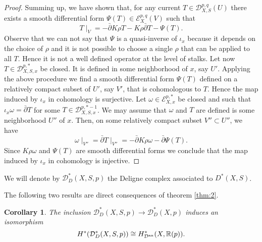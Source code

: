 \documentclass[10pt,twoside]{article}
\numberwithin{equation}{section}
\theoremstyle{plain}
\newtheorem{corollary}[equation]{Corollary}
\theoremstyle{definition}
\newcommand{\an}{\text{{\rm an}}}
\begin{document}
\begin{proof}
  Summing up, we have shown that, for any current $T\in
  \mathscr{D}^{p,q}_{X,S}(U)$ there exists a smooth differential form
  $\Psi (T)\in \mathscr{E}^{p,q}_{X}(V)$ such that
  \begin{displaymath}
    T\mid _{V}=-\bar \partial K\rho T -K\rho \bar \partial T -\Psi (T).
  \end{displaymath}
  Observe that we can not say that $\Psi $ is a quasi-inverse of
  $\iota _{x}$ because it depends on the choice of $\rho $ and it is
  not possible to choose a single $\rho $ that can be applied to all
  $T$. Hence it 
  is not a well defined operator at the level of stalks. 
  Let now $T\in \mathscr{D}^{p,*}_{X,S,x}$ be closed. It is defined in
  some neighborhood of $x$, say $U'$. Applying the above procedure we
  find a smooth differential form $\Psi (T)$ defined on a relatively
  compact subset of $U'$, say $V'$, that is cohomologous to $T$. Hence
  the map induced by $\iota _{x}$ in cohomology is surjective. Let
  $\omega \in \mathscr{E}^{p,*}_{X,x}$ be closed and such that $\iota
  _{x}\omega =\bar \partial T$ for some $T\in
  \mathscr{D}^{p,*-1}_{X,S,x}$. We may assume that $\omega $ and $T$
  are defined is some neighborhood $U''$ of $x$. Then, on some
  relatively compact subset $V''\subset U''$, we have
  \begin{displaymath}
    \omega \mid _{V''} = \bar \partial T\mid _{V''}=-\bar \partial K\rho \omega
    - \bar \partial \Psi (T).
  \end{displaymath}
  Since $K\rho \omega$ and $\Psi (T)$ are smooth differential forms we
  conclude that the map induced by $\iota_{x}$ in cohomology is injective.
\end{proof}

We will denote by  
$\mathcal{D}^{\ast}_{D}(X,S,p)$ the Deligne complex associated to
$D^{\ast}(X,S)$.

The following two results are direct consequences of theorem \ref{thm:2}.
\begin{corollary} \label{cor:2} The inclusion
  $\mathcal{D}^{\ast}_{D}(X,S,p)\longrightarrow
  \mathcal{D}^{\ast}_{D}(X,p)$ induces 
  an isomorphism  
\begin{displaymath}
  H^{\ast}(\mathcal{D}^{\ast}_{D}(X,S,p)) \cong
H^{\ast}_{\mathcal{D}^{\an}}(X,\mathbb{R}(p)).
\end{displaymath}
\end{corollary}
\end{document}
